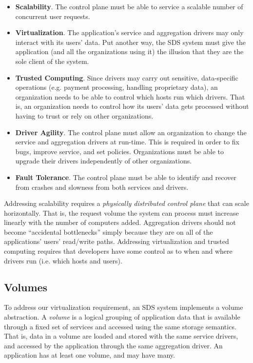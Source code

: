 \begin{itemize}
    \item \textbf{Scalability}.  The control plane must be able to service a
    scalable number of concurrent user requests. 
    \item \textbf{Virtualization}.  The application's service and aggregation
    drivers may only interact with its users' data.  Put another way,
      the SDS system must give the application (and all the organizations using
      it) the illusion that they are the sole client of the system.
    \item \textbf{Trusted Computing}.  Since drivers may carry out sensitive,
    data-specific operations (e.g. payment processing, handling proprietary
    data), an organization needs to be able to control which hosts run which
    drivers.  That is, an organization needs to
    control how its users' data gets processed without having to trust or rely
    on other organizations.
    \item \textbf{Driver Agility}.  The control plane must allow an organization to
    change the service and aggregation drivers at run-time.
    This is required in order to fix bugs, improve service, and set policies.
    Organizations must be able to upgrade their drivers independently of other organizations.
    \item \textbf{Fault Tolerance}.  The control plane must be able to identify
    and recover from crashes and slowness from both services and drivers.
\end{itemize}

Addressing scalability requires a \emph{physically distributed control plane} that can
scale horizontally.  That is, the request volume the system can process must
increase linearly with the number of computers added.
Aggregation drivers should not become ``accidental
bottlenecks'' simply because they are on all of the applications' users' read/write paths.
Addressing virtualization and trusted computing requires that developers have some
control as to when and where drivers run (i.e. which hosts and users).

\subsection{Volumes}

To address our virtualization requirement, an SDS system
implements a volume abstraction.  A \emph{volume} is a logical grouping of
application data that is available through a fixed set of services and accessed
using the same storage semantics.  That is, data in a volume are loaded and
stored with the same service drivers, and accessed by the application through
the same aggregation driver.  An application has at least one volume, and may have many.

